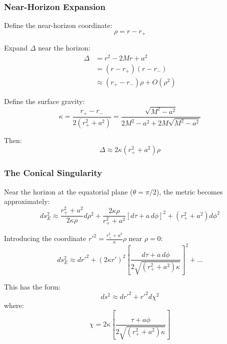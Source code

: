 \documentclass[11pt]{article}
\begin{document}
\subsubsection{Near-Horizon Expansion}

Define the near-horizon coordinate:
\begin{equation}
\rho = r - r_+
\end{equation}

Expand $\Delta$ near the horizon:
\begin{align}
\Delta &= r^2 - 2Mr + a^2 \\
&= (r - r_+)(r - r_-) \\
&\approx (r_+ - r_-)\rho + O(\rho^2)
\end{align}

Define the surface gravity:
\begin{equation}
\kappa = \frac{r_+ - r_-}{2(r_+^2 + a^2)} = \frac{\sqrt{M^2-a^2}}{2M^2 - a^2 + 2M\sqrt{M^2-a^2}}
\end{equation}

Then:
\begin{equation}
\Delta \approx 2\kappa(r_+^2 + a^2)\rho
\end{equation}

\subsubsection{The Conical Singularity}

Near the horizon at the equatorial plane ($\theta = \pi/2$), the metric becomes approximately:
\begin{equation}
ds^2_E \approx \frac{r_+^2 + a^2}{2\kappa\rho}d\rho^2 + \frac{2\kappa\rho}{r_+^2 + a^2}[d\tau + a\,d\phi]^2 + (r_+^2+a^2)d\phi^2
\end{equation}

Introducing the coordinate $r'^2 = \frac{r_+^2 + a^2}{\kappa}\rho$ near $\rho = 0$:
\begin{equation}
ds^2_E \approx dr'^2 + (2\kappa r')^2 \left[\frac{d\tau + a\,d\phi}{2\sqrt{(r_+^2+a^2)\kappa}}\right]^2 + \ldots
\end{equation}

This has the form:
\begin{equation}
ds^2 \approx dr'^2 + r'^2 d\chi^2
\end{equation}
where:
\begin{equation}
\chi = 2\kappa\left[\frac{\tau + a\phi}{2\sqrt{(r_+^2+a^2)\kappa}}\right]
\end{equation}
\end{document}
